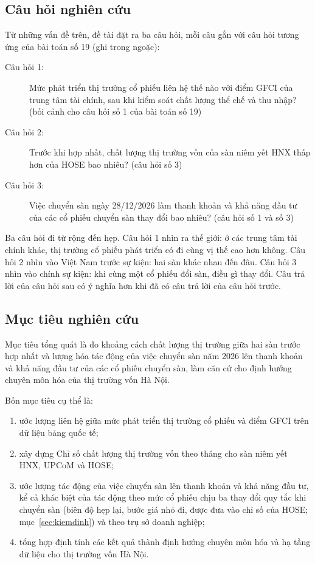 \subsection*{Câu hỏi nghiên cứu}

Từ những vấn đề trên, đề tài đặt ra ba câu hỏi, mỗi câu gắn với câu hỏi tương ứng của bài toán số 19 (ghi trong ngoặc):

\begin{description}
\item[Câu hỏi 1:] Mức phát triển thị trường cổ phiếu liên hệ thế nào với điểm GFCI của trung tâm tài chính, sau khi kiểm soát chất lượng thể chế và thu nhập? (bối cảnh cho câu hỏi số 1 của bài toán số 19)
\item[Câu hỏi 2:] Trước khi hợp nhất, chất lượng thị trường vốn của sàn niêm yết HNX thấp hơn của HOSE bao nhiêu? (câu hỏi số 3)
\item[Câu hỏi 3:] Việc chuyển sàn ngày 28/12/2026 làm thanh khoản và khả năng đầu tư của các cổ phiếu chuyển sàn thay đổi bao nhiêu? (câu hỏi số 1 và số 3)
\end{description}

Ba câu hỏi đi từ rộng đến hẹp. Câu hỏi 1 nhìn ra thế giới: ở các trung tâm tài chính khác, thị trường cổ phiếu phát triển có đi cùng vị thế cao hơn không. Câu hỏi 2 nhìn vào Việt Nam trước sự kiện: hai sàn khác nhau đến đâu. Câu hỏi 3 nhìn vào chính sự kiện: khi cùng một cổ phiếu đổi sàn, điều gì thay đổi. Câu trả lời của câu hỏi sau có ý nghĩa hơn khi đã có câu trả lời của câu hỏi trước.

\subsection*{Mục tiêu nghiên cứu}

Mục tiêu tổng quát là đo khoảng cách chất lượng thị trường giữa hai sàn trước hợp nhất và lượng hóa tác động của việc chuyển sàn năm 2026 lên thanh khoản và khả năng đầu tư của các cổ phiếu chuyển sàn, làm căn cứ cho định hướng chuyên môn hóa của thị trường vốn Hà Nội.

Bốn mục tiêu cụ thể là:
\begin{enumerate}[label=(\roman*)]
\item ước lượng liên hệ giữa mức phát triển thị trường cổ phiếu và điểm GFCI trên dữ liệu bảng quốc tế;
\item xây dựng Chỉ số chất lượng thị trường vốn theo tháng cho sàn niêm yết HNX, UPCoM và HOSE;
\item ước lượng tác động của việc chuyển sàn lên thanh khoản và khả năng đầu tư, kể cả khác biệt của tác động theo mức cổ phiếu chịu ba thay đổi quy tắc khi chuyển sàn (biên độ hẹp lại, bước giá nhỏ đi, được đưa vào chỉ số của HOSE; mục~\ref{sec:kiemdinh}) và theo trụ sở doanh nghiệp;
\item tổng hợp định tính các kết quả thành định hướng chuyên môn hóa và hạ tầng dữ liệu cho thị trường vốn Hà Nội.
\end{enumerate}

